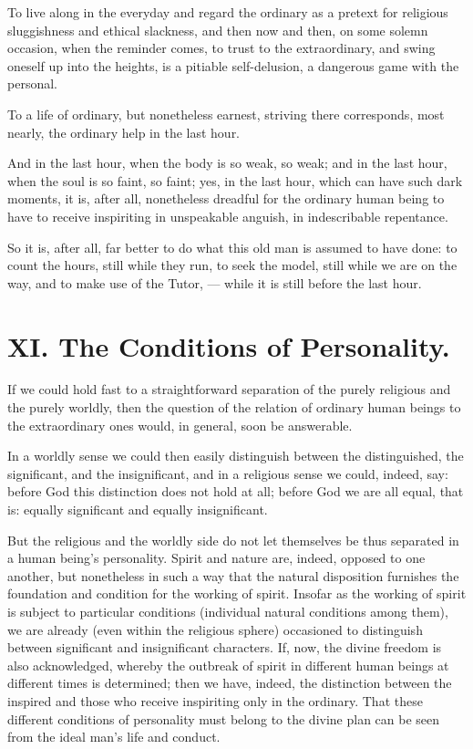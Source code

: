 \documentclass[12pt,a4paper]{book}
\begin{document}
To live along in the everyday and regard the ordinary as a pretext for religious sluggishness and ethical slackness, and then now and then, on some solemn occasion, when the reminder comes, to trust to the extraordinary, and swing oneself up into the heights, is a pitiable self-delusion, a dangerous game with the personal.

To a life of ordinary, but nonetheless earnest, striving there corresponds, most nearly, the ordinary help in the last hour.

And in the last hour, when the body is so weak, so weak; and in the last hour, when the soul is so faint, so
faint; yes, in the last hour, which can have such dark moments, it is, after all, nonetheless dreadful for the ordinary human being to have to receive inspiriting in unspeakable anguish, in indescribable repentance.

So it is, after all, far better to do what this old man is assumed to have done: to count the hours, still while they run, to seek the model, still while we are on the way, and to make use of the Tutor, --- while it is still before the last hour.

\chapter*{XI. The Conditions of Personality.}
\label{ch:forel11}

If we could hold fast to a straightforward separation of the purely religious and the purely worldly, then the question of the relation of ordinary human beings to the extraordinary ones would, in general, soon be answerable.

In a worldly sense we could then easily distinguish between the distinguished, the significant, and the insignificant, and in a religious sense we could, indeed, say: before God this distinction does not hold at all; before God we are all equal, that is: equally significant and equally insignificant.

But the religious and the worldly side do not let themselves be thus separated in a human being's personality. Spirit and nature are, indeed, opposed to one another, but nonetheless in such a way that the natural disposition furnishes the foundation and condition for the working of spirit. Insofar as the working of spirit is subject to particular conditions (individual natural conditions among them), we are already (even within the religious sphere) occasioned to distinguish between significant and insignificant characters. If, now, the divine freedom is also acknowledged, whereby the outbreak of spirit in different human beings at different times is determined; then we have, indeed, the distinction between the inspired and those who receive inspiriting only in the ordinary.
That these different conditions of personality must belong to the divine plan can be seen from the ideal man's life and conduct.
\end{document}
